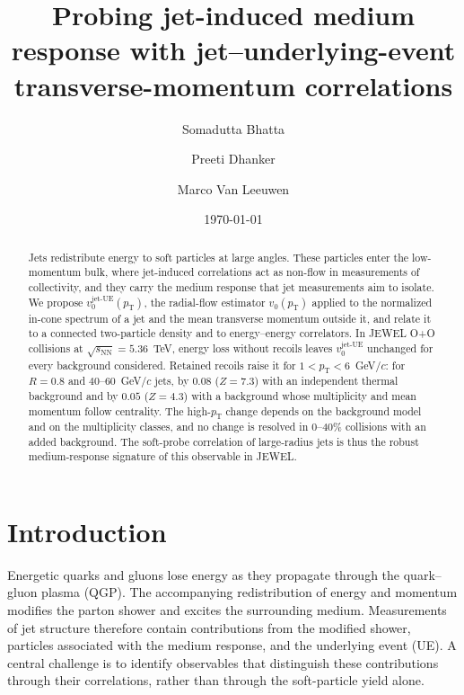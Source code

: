 \documentclass[aps,prc,twocolumn,superscriptaddress,nofootinbib,longbibliography,floatfix,10pt]{revtex4-2}
\newcommand{\pT}{p_{\mathrm T}}
\newcommand{\vjet}{{v_0^{\mathrm{jet\text{-}UE}}}}
\begin{document}
\title{Probing jet-induced medium response with jet--underlying-event transverse-momentum correlations}
\author{Somadutta Bhatta}
\author{Preeti Dhanker}
\date{\today}
\author{Marco Van Leeuwen}
\begin{abstract}
Jets redistribute energy to soft particles at large angles. These particles enter the low-momentum bulk, where jet-induced correlations act as non-flow in measurements of collectivity, and they carry the medium response that jet measurements aim to isolate. We propose $\vjet(\pT)$, the radial-flow estimator $v_0(\pT)$ applied to the normalized in-cone spectrum of a jet and the mean transverse momentum outside it, and relate it to a connected two-particle density and to energy--energy correlators. In JEWEL O+O collisions at $\sqrt{s_{\mathrm{NN}}}=5.36$~TeV, energy loss without recoils leaves $\vjet$ unchanged for every background considered. Retained recoils raise it for $1<\pT<6$~GeV/$c$: for $R=0.8$ and $40$--$60$~GeV/$c$ jets, by $0.08$ ($Z=7.3$) with an independent thermal background and by $0.05$ ($Z=4.3$) with a background whose multiplicity and mean momentum follow centrality. The high-$\pT$ change depends on the background model and on the multiplicity classes, and no change is resolved in 0--40\% collisions with an added background. The soft-probe correlation of large-radius jets is thus the robust medium-response signature of this observable in JEWEL.
\end{abstract}
\maketitle

\section{Introduction}\label{sec:intro}
Energetic quarks and gluons lose energy as they propagate through the quark--gluon plasma (QGP). The accompanying redistribution of energy and momentum modifies the parton shower and excites the surrounding medium. Measurements of jet structure therefore contain contributions from the modified shower, particles associated with the medium response, and the underlying event (UE). A central challenge is to identify observables that distinguish these contributions through their correlations, rather than through the soft-particle yield alone.
\end{document}
